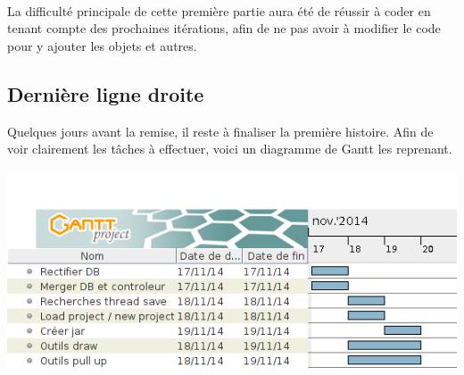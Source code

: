 \documentclass[a4paper, 12pt]{report}
\begin{document}

				
				\paragraph{} La difficulté principale de cette première partie aura été de réussir à coder en tenant compte des prochaines itérations, afin de ne pas avoir à modifier le code pour y ajouter les objets et autres.
				
			\subsection{Dernière ligne droite}
				Quelques jours avant la remise, il reste à finaliser la première histoire. Afin de voir clairement les tâches à effectuer, voici un diagramme de Gantt les reprenant.
				\begin{center}
					\includegraphics[scale=0.5]{images/gantt_it1.png}
				\end{center}	
				
\end{document}
